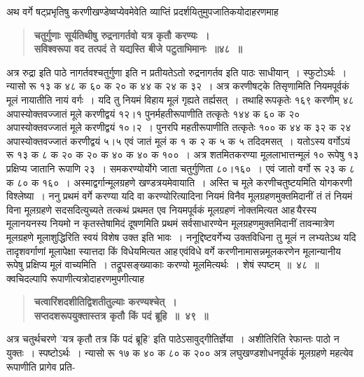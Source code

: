 \documentclass[11pt, openany]{book}
\begin{document}
\newpage

\begin{sloppypar}
{\small अथ वर्गे षट्प्रभृतिषु करणीखण्डेष्वप्येवमेवेति व्याप्तिं प्रदर्शयितुमुपजातिकयोदाहरणमाह\textendash }

 \label{4.48}
\begin{quote}
{\large \textbf{{\color{purple}चतुर्गुणाः सूर्यतिथीषु रुद्रनागर्तवो यत्र कृतौ करण्यः~।\\
सविश्वरूपा वद तत्पदं ते यद्यस्ति बीजे पटुताभिमानः~॥४८~॥}}}
\end{quote}

अत्र रुद्रा इति पाठे नागर्तवश्चतुर्गुणा इति न प्रतीयतेऽतो रुद्रनागर्तव इति पाठः साधीयान्~। स्फुटोऽर्थः~। न्यासो रू १३ क ४८ क ६० क २० क ४४ क २४ क ३२~। अत्र करणीषट्के तिसृणामिति नियमपूर्वकं मूलं नायातीति नायं वर्गः~। यदि तु नियमं विहाय मूलं गृह्यते तर्ह्यसत्~। तथाहि\textendash \,रूपकृतेः १६९ करणीम् ४८ अपास्योक्तवज्जातं मूले करणीद्वयं १२।१ पुनर्महतीरूपाणीति तत्कृतेः १४४ क ६० क २० अपास्योक्तवज्जातं मूले करणीद्वयं १०।२~। पुनरपि महतीरूपाणीति तत्कृतेः १०० क ४४ क ३२ क २४ अपास्योक्तवज्जातं करणीद्वयं ५।५ एवं जातं मूलं क १ क २ क ५ क ५ तदिदमसत्~। यतोऽस्य वर्गोऽयं रू १३ क ८ क २० क २० क ४० क ४० क १००~। अत्र शतमितकरण्या मूललाभात्तन्मूलं १० रूपेषु १३ प्रक्षिप्य जातानि रूपाणि २३~। समकरण्योर्योगे जाता चतुर्गुणिता ८०।१६०~। एवं जातो वर्गो रू २३ क ८ क ८० क १६०~। अस्माद्वर्गान्मूलग्रहणे खण्डत्रयमेवायाति~। अस्ति च मूले करणीचतुष्टयमिति योगकरणी विश्लेष्या~। ननु प्रथमं वर्गे करण्या यदि वा करण्योरित्यादिना नियमं विनैव मूलग्रहणमुक्तमिदानीं तं तं नियमं विना मूलग्रहणे सदसदित्युच्यते तत्कथं प्रथमत एव नियमपूर्वकं मूलग्रहणं नोक्तमित्यत आह\textendash \,यैरस्य मूलानयनस्य नियमो न कृतस्तेषामिदं दूषणमिति प्रथमं सर्वसाधारण्येन मूलग्रहणमुक्तमिदानीं तावन्मात्रेण मूलग्रहणे मूलाशुद्धिरिति स्वयं विशेष उक्त इति भावः~। ननूद्दिष्टवर्गेभ्य उक्तविधिना तु मूलं न लभ्यतेऽथ यदि तादृशवर्गाणां मूलापेक्षा स्यात्तदा किं विधेयमित्यत आह\textendash \,एवंविधे वर्गे करणीनामासन्नमूलकरणेन मूलान्यानीय रूपेषु प्रक्षिप्य मूलं वाच्यमिति~। तद्रूपसङ्ख्याकाः करण्यो मूलमित्यर्थः~। शेषं स्पष्टम्~॥~४८~॥ \\

{\small क्वचिदल्पापि रूपाणीत्यत्रोदाहरणमुपगीत्याह\textendash }

 \label{4.49}
\begin{quote}
{\large \textbf{{\color{purple}चत्वारिंशदशीतिद्विशतीतुल्याः करण्यश्चेत्~।\\
सप्तदशरूपयुक्तास्तत्र कृतौ किं पदं ब्रूहि~॥~४९~॥}}}
\end{quote}

अत्र चतुर्थचरणे 'यत्र कृतौ तत्र किं पदं ब्रूहि' इति पाठेऽसावुद्गीतिर्ज्ञेया~। अशीतिरिति रेफान्तः पाठो न युक्तः~। स्पष्टोऽर्थः~। न्यासो रू १७ क ४० क ८० क २०० अत्र लघुखण्डशोधनपूर्वकं मूलग्रहणे महत्येव रूपाणीति प्रागेव प्रति-
\end{sloppypar}
\end{document}

